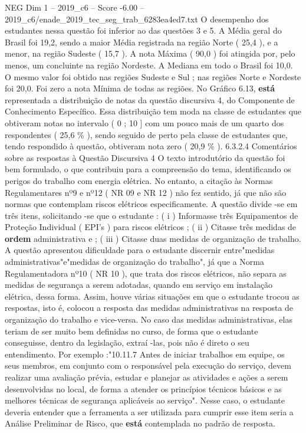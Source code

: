 \begin{textsample}{NEG Dim 1 – 2019\_c6 – Score -6.00 – 2019\_c6/enade\_2019\_tec\_seg\_trab\_6283ea4ed7.txt}
O desempenho dos estudantes nessa questão foi inferior ao das questões 3 e 5.
A Média geral do Brasil foi 19,2, sendo a maior Média registrada na região Norte ( 25,4 ), e a menor, na região Sudeste ( 15,7 ).
A nota Máxima ( 90,0 ) foi atingida por, pelo menos, um concluinte na região Nordeste.
A Mediana em todo o Brasil foi 10,0.
O mesmo valor foi obtido nas regiões Sudeste e Sul ; nas regiões Norte e Nordeste foi 20,0.
Foi zero a nota Mínima de todas as regiões.
No Gráfico 6.13, \textbf{está} representada a distribuição de notas da questão discursiva 4, do Componente de Conhecimento Específico.
Essa distribuição tem moda na classe de estudantes que obtiveram notas no intervalo ( 0 ; 10 ] com um pouco mais de um quarto dos respondentes ( 25,6 \% ), sendo seguido de perto pela classe de estudantes que, tendo respondido à questão, obtiveram nota zero ( 20,9 \% ). 6.3.2.4 Comentários sobre as respostas à Questão Discursiva 4 O texto introdutório da questão foi bem formulado, o que contribuiu para a compreensão do tema, identificando os perigos do trabalho com energia elétrica.
No entanto, a citação às Normas Regulamentares nº9 e nº12 ( NR 09 e NR 12 ) não fez sentido, já que não são normas que contemplam riscos elétricos especificamente.
A questão divide -se em três itens, solicitando -se que o estudante : ( i ) Informasse três Equipamentos de Proteção Individual ( EPI's ) para riscos elétricos ; ( ii ) Citasse três medidas de \textbf{ordem} administrativa e ; ( iii ) Citasse duas medidas de organização de trabalho.
A questão apresentou dificuldade para o estudante discernir entre"medidas administrativas"e"medidas de organização do trabalho", já que a Norma Regulamentadora nº10 ( NR 10 ), que trata dos riscos elétricos, não separa as medidas de segurança a serem adotadas, quando em serviço em instalação elétrica, dessa forma.
Assim, houve várias situações em que o estudante trocou as respostas, isto é, colocou a resposta das medidas administrativas na resposta de organização do trabalho e vice-versa.
No caso das medidas administrativas, elas teriam de ser muito bem definidas no curso, de forma que o estudante conseguisse, dentro da legislação, extraí -las, pois não é direto o seu entendimento.
Por exemplo :"10.11.7 Antes de iniciar trabalhos em equipe, os seus membros, em conjunto com o responsável pela execução do serviço, devem realizar uma avaliação prévia, estudar e planejar as atividades e ações a serem desenvolvidas no local, de forma a atender os princípios técnicos básicos e as melhores técnicas de segurança aplicáveis ao serviço".
Nesse caso, o estudante deveria entender que a ferramenta a ser utilizada para cumprir esse item seria a Análise Preliminar de Risco, que \textbf{está} contemplada no padrão de resposta.

\end{textsample}
